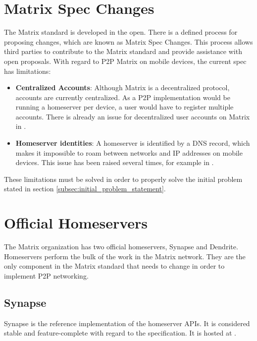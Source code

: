 \section{Matrix Spec Changes}
The Matrix standard is developed in the open.
There is a defined process for proposing changes, which are known as Matrix Spec Changes\cite{matrix_org_spec_changes}.
This process allows third parties to contribute to the Matrix standard and provide assistance with open proposals.
With regard to \ac{P2P} Matrix on mobile devices, the current spec has limitations:
\begin{itemize}
      \item{
            \textbf{Centralized Accounts}:
            Although Matrix is a decentralized protocol, accounts are currently centralized.
            As a \ac{P2P} implementation would be running a homeserver per device, a user would have to register multiple accounts.
            There is already an issue for decentralized user accounts on Matrix in .
            }
      \item{
            \textbf{Homeserver identities}:
            A homeserver is identified by a DNS record, which makes it impossible to roam between networks and IP addresses on mobile devices.
            This issue has been raised several times, for example in .
            }
\end{itemize}
These limitations must be solved in order to properly solve the initial problem stated in section \ref{subsec:initial_problem_statement}.

\section{Official Homeservers}\label{sec:official_homeservers}
The Matrix organization has two official homeservers, Synapse\cite{matrix_org_synapse} and Dendrite\cite{matrix_org_dendrite}.
Homeservers perform the bulk of the work in the Matrix network.
They are the only component in the Matrix standard that needs to change in order to implement \ac{P2P} networking\cite{fosdem_event_p2p_matrix}.

\subsection{Synapse}
Synapse is the reference implementation of the homeserver \ac{API}s.
It is considered stable and feature-complete with regard to the specification.
It is hosted at .

